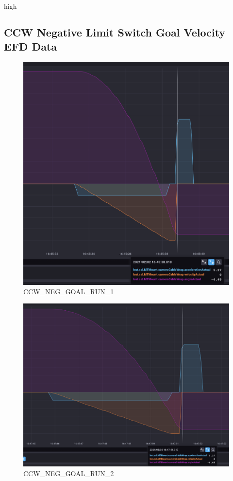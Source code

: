 high\documentclass[SE,lsstdraft,authoryear,toc]{lsstdoc}
\begin{document}
\subsection{CCW Negative Limit Switch Goal Velocity EFD Data}
\begin{figure}[h!]
  \includegraphics[width=\linewidth]{media/CCW_high_speed_neg_test1.png}
  \caption{CCW\_NEG\_GOAL\_RUN\_1}
  \label{fig:CCW_NEG_GOAL_RUN_1}
\end{figure}
\begin{figure}[h!]
  \includegraphics[width=\linewidth]{media/CCW_high_speed_neg_test2.png}
  \caption{CCW\_NEG\_GOAL\_RUN\_2}
  \label{fig:CCW_NEG_GOAL_RUN_2}
\end{figure}
\end{document}
